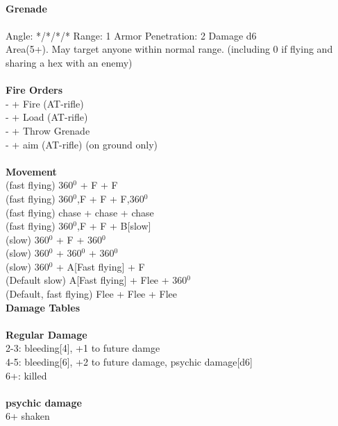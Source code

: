 \ \\
{\bf Grenade } \\
\ \\
Angle: */*/*/* Range: 1 Armor Penetration: 2 Damage d6 \\
\indent Area(5+). May target anyone within normal range. (including 0 if flying and sharing a hex with an enemy) \\





\ \\ {\bf Fire Orders } \\
- + Fire (AT-rifle) \\
- + Load (AT-rifle) \\
- + Throw Grenade \\
- + aim (AT-rifle) (on ground only) \\
\ \\ {\bf Movement } \\
(fast flying) 360$^0$ + F + F \\
(fast flying) 360$^0$,F + F + F,360$^0$ \\
(fast flying) chase + chase + chase \\
(fast flying) 360$^0$,F + F + B[slow] \\
(slow) 360$^0$ + F + 360$^0$ \\
(slow) 360$^0$ + 360$^0$ + 360$^0$ \\
(slow) 360$^0$ + A[Fast flying] + F \\
(Default slow) A[Fast flying] + Flee + 360$^0$  \\
(Default, fast flying) Flee + Flee + Flee \\



{\bf Damage Tables} \\
\ \\ {\bf Regular Damage } \\
2-3: bleeding[4], +1 to future damge \\
4-5: bleeding[6], +2 to future damage, psychic damage[d6] \\
6+: killed \\
\ \\ {\bf psychic damage } \\
6+ shaken \\










